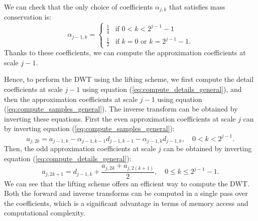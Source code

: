 We can check that the only choice of coefficients \( \alpha_{j,k} \) that satisfies mass conservation is:
\begin{equation} \label{eq:alpha}
    \alpha_{j-1,k} =
    \begin{cases}
    \frac{1}{4} & \text{if } 0 < k < 2^{j-1}-1 \\
    \frac{1}{2} & \text{if } k = 0 \text{ or } k = 2^{j-1}-1.
    \end{cases}
\end{equation}
Thanks to these coefficients, we can compute the approximation coefficients at scale \( j-1 \).

Hence, to perform the DWT using the lifting scheme, we first compute the detail coefficients at scale \( j-1 \) using equation (\ref{eq:compute_details_general}), and then the approximation coefficients at scale \( j-1 \) using equation (\ref{eq:compute_samples_general}).
The inverse transform can be obtained by inverting these equations.
First the even approximation coefficients at scale $j$ can by inverting equation (\ref{eq:compute_samples_general}):
\begin{equation}
a_{j,2k} = a_{j-1,k} - \alpha_{j-1,k-1} d_{j-1,k-1} - \alpha_{j-1,k} d_{j-1,k}, \quad 0 < k < 2^{j-1}.
\end{equation}
Then, the odd approximation coefficients at scale $j$ can be obtained by inverting equation (\ref{eq:compute_details_general}):
\begin{equation}
a_{j,2k+1} = d_{j-1,k} + \frac{a_{j,2k}+a_{j,2(k+1)}}{2}, \quad 0 \leq k \leq 2^{j-1}-1.
\end{equation}
We can see that the lifting scheme offers an efficient way to compute the DWT.
Both the forward and inverse transforms can be computed in a single pass over the coefficients, which is a significant advantage in terms of memory access and computational complexity.

